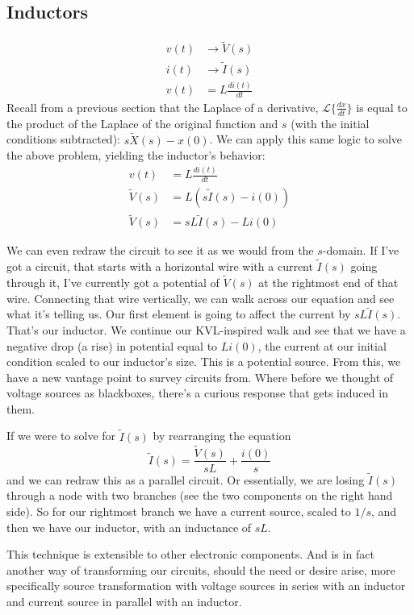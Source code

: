 \documentclass[11pt]{book}
\begin{document}
\subsection{Inductors}
\begin{align}
	v(t) & \rightarrow \tilde{V}(s) \\
	i(t) & \rightarrow \tilde{I}(s) \\
	v(t) &= L\frac{di(t)}{dt} 
\end{align}
Recall from a previous section that the Laplace of a derivative, $\mathcal{L}\{\frac{dx}{dt}\}$ is equal to the product of the Laplace of the original function and $s$ (with the initial conditions subtracted): $s\tilde{X}(s) - x(0)$. We can apply this same logic to solve the above problem, yielding the inductor's behavior:
\begin{align}
	v(t) &= L\frac{di(t)}{dt} \\
	\tilde{V}(s) &= L(s\tilde{I}(s) - i(0)) \\
	\tilde{V}(s) &= sL\tilde{I}(s) - Li(0)
\end{align}

We can even redraw the circuit to see it as we would from the $s$-domain. If I've got a circuit, that starts with a horizontal wire with a current $\tilde{I}(s)$ going through it, I've currently got a potential of $\tilde{V}(s)$ at the rightmost end of that wire. Connecting that wire vertically, we can walk across our equation and see what it's telling us. Our first element is going to affect the current by $sL\tilde{I}(s)$. That's our inductor. We continue our KVL-inspired walk and see that we have a negative drop (a rise) in potential equal to $Li(0)$, the current at our initial condition scaled to our inductor's size. This is a potential source. From this, we have a new vantage point to survey circuits from. Where before we thought of voltage sources as blackboxes, there's a curious response that gets induced in them.

If we were to solve for $\tilde{I}(s)$ by rearranging the equation
\begin{equation}
	\tilde{I}(s) = \frac{\tilde{V}(s)}{sL} + \frac{i(0)}{s}
\end{equation}
and we can redraw this as a parallel circuit. Or essentially, we are losing $\tilde{I}(s)$ through a node with two branches (see the two components on the right hand side). So for our rightmost branch we have a current source, scaled to $1/s$, and then we have our inductor, with an inductance of $sL$.

This technique is extensible to other electronic components. And is in fact another way of transforming our circuits, should the need or desire arise, more specifically source transformation with voltage sources in series with an inductor and current source in parallel with an inductor.
\end{document}
